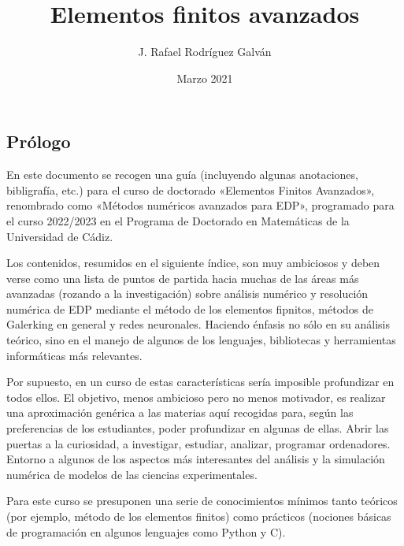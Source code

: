 \documentclass[11pt]{article}
\title{Elementos finitos avanzados}
\author{J. Rafael Rodríguez Galván}
\date{Marzo 2021}
\begin{document}
\maketitle
\tableofcontents

\subsection*{Prólogo}
En este documento se recogen una guía (incluyendo algunas anotaciones,
bibligrafía, etc.) para el curso de doctorado «Elementos Finitos Avanzados», 
renombrado como «Métodos numéricos avanzados para EDP»,
programado para el curso 2022/2023 en el Programa de
Doctorado en Matemáticas de la Universidad de Cádiz.

Los contenidos, resumidos en el siguiente índice, son muy
ambiciosos y deben verse como una lista de puntos de
partida hacia muchas de las áreas más avanzadas (rozando a
la investigación) sobre análisis numérico y resolución
numérica de EDP mediante el método de los elementos
fipnitos, métodos de Galerking en general y redes
neuronales. Haciendo énfasis no sólo en su análisis
teórico, sino en el manejo de algunos de los lenguajes,
bibliotecas y herramientas informáticas más relevantes.

Por supuesto, en un curso de estas características sería
imposible profundizar en todos ellos. El objetivo, menos
ambicioso pero no menos motivador, es realizar una
aproximación genérica a las materias aquí recogidas para,
según las preferencias de los estudiantes, poder
profundizar en algunas de ellas.  Abrir las puertas a la
curiosidad, a investigar, estudiar, analizar, programar
ordenadores. Entorno a algunos de los aspectos más
interesantes del análisis y la simulación numérica de
modelos de las ciencias experimentales.

Para este curso se presuponen una serie de conocimientos mínimos tanto
teóricos (por ejemplo, método de los elementos finitos) como prácticos
(nociones básicas de programación en algunos lenguajes como Python y C).


% 


% 
% 
% 
% 
% 
% 
% 
% 

% 



\end{document}
